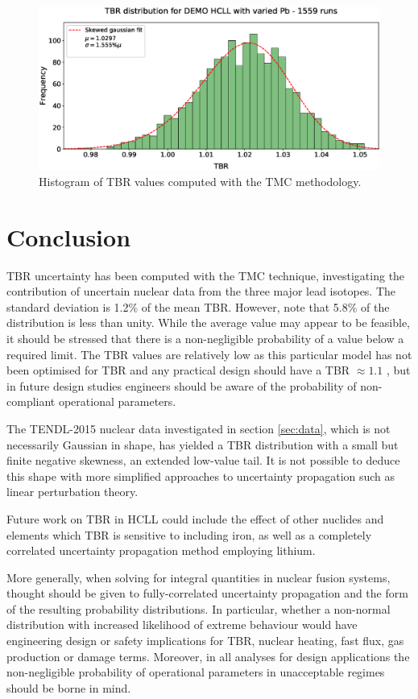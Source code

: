 \begin{figure}[H]
	\includegraphics[width=\textwidth]{hcll_hist_1559}
	\caption{Histogram of TBR values computed with the TMC methodology.}
	\label{fig:tbr_distribution}
\end{figure}

\section{Conclusion}
TBR uncertainty has been computed with the TMC technique, investigating the contribution of uncertain nuclear data from the three major lead isotopes. The standard deviation is 1.2\% of the mean TBR. However, note that 5.8\% of the distribution is less than unity. While the average value may appear to be feasible, it should be stressed that there is a non-negligible probability of a value below a required limit. The TBR values are relatively low as this particular model has not been optimised for TBR and any practical design should have a TBR $\approx 1.1$ \cite{Fischer2015}, but in future design studies engineers should be aware of the probability of non-compliant operational parameters. 

The TENDL-2015 nuclear data investigated in section \ref{sec:data}, which is not necessarily Gaussian in shape, has yielded a TBR distribution with a small but finite negative skewness, an extended low-value tail. It is not possible to deduce this shape with more simplified approaches to uncertainty propagation such as linear perturbation theory.

Future work on TBR in HCLL could include the effect of other nuclides and elements which TBR is sensitive to including iron, as well as a completely correlated uncertainty propagation method employing lithium. 

More generally, when solving for integral quantities in nuclear fusion systems, thought should be given to fully-correlated uncertainty propagation and the form of the resulting probability distributions. In particular, whether a non-normal distribution with increased likelihood of extreme behaviour would have engineering design or safety implications for TBR, nuclear heating, fast flux, gas production or damage terms. Moreover, in all analyses for design applications the non-negligible probability of operational parameters in unacceptable regimes should be borne in mind.

